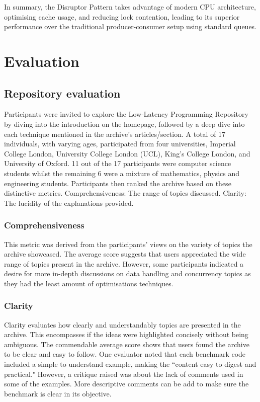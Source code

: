 \documentclass{article}
\theoremstyle{break}
\begin{document}
\noindent In summary, the Disruptor Pattern takes advantage of modern CPU architecture, optimising cache usage, and reducing lock contention, leading to its superior performance over the traditional producer-consumer setup using standard queues. 



\section{Evaluation}


\subsection{Repository evaluation}

Participants were invited to explore the Low-Latency Programming Repository by diving into the introduction on the homepage, followed by a deep dive into each technique mentioned in the archive's articles/section. A total of 17 individuals, with varying ages, participated from four universities, Imperial College London, University College London (UCL), King's College London, and University of Oxford. 11 out of the 17 participants were computer science students whilst the remaining 6 were a mixture of mathematics, physics and engineering students. Participants then ranked the archive based on these distinctive metrics. Comprehensiveness: The range of topics discussed. Clarity: The lucidity of the explanations provided.

\subsubsection*{Comprehensiveness}
This metric was derived from the participants' views on the variety of topics the archive showcased. The average score suggests that users appreciated the wide range of topics present in the archive. However, some participants indicated a desire for more in-depth discussions on data handling and concurrency topics as they had the least amount of optimisations techniques.


\subsubsection*{Clarity}
Clarity evaluates how clearly and understandably topics are presented in the archive. This encompasses if the ideas were highlighted concisely without being ambiguous. The commendable average score shows that users found the archive to be clear and easy to follow. One evaluator noted that each benchmark code included a simple to understand example, making the ``content easy to digest and practical." However, a critique raised was about the lack of comments used in some of the examples. More descriptive comments can be add to make sure the benchmark is clear in its objective.
\end{document}
